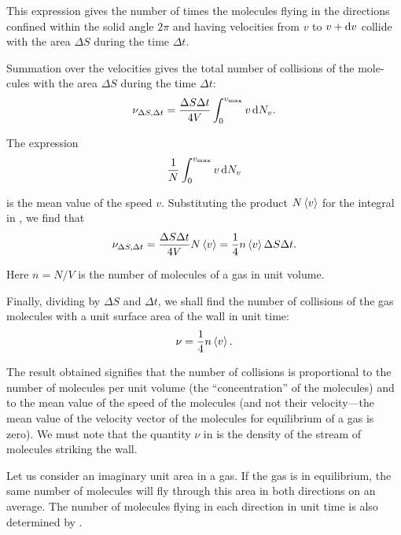 \noindent
This expression gives the number of times the molecules flying in the directions confined within the solid angle $2\pi$ and having velocities from $v$ to $v+\mathrm{d} v$ collide with the area $\Delta S$ during the time $\Delta t$.

Summation over the velocities gives the total number of collisions of the mole-cules with the area $\Delta S$ during the time $\Delta t$:
\begin{equation}\label{eq:11_21}
	\nu_{\Delta S,\Delta t} = \frac{\Delta S \Delta t}{4V} \int_{0}^{v_{\text{max}}} v\,\mathrm{d} N_v.
\end{equation}

\noindent
The expression
\begin{equation*}
	\frac{1}{N}\int_{0}^{v_{\text{max}}} v\,\mathrm{d} N_v
\end{equation*}

\noindent
is the mean value of the speed $v$. Substituting the product $N\left\langle v \right\rangle$ for the integral in , we find that
\begin{equation}\label{eq:11_22}
	\nu_{\Delta S,\Delta t} = \frac{\Delta S \Delta t}{4V} N\left\langle v \right\rangle = \frac{1}{4}n \left\langle v \right\rangle\Delta S \Delta t.
\end{equation}

\noindent
Here $n=N/V$ is the number of molecules of a gas in unit volume.

Finally, dividing  by $\Delta S$ and $\Delta t$, we shall find the number of collisions of the gas molecules with a unit surface area of the wall in unit time:
\begin{equation}\label{eq:11_23}
	\nu = \frac{1}{4} n \left\langle v \right\rangle.
\end{equation}

\noindent
The result obtained signifies that the number of collisions is proportional to the number of molecules per unit volume (the ``concentration'' of the molecules) and to the mean value of the speed of the molecules (and not their velocity---the mean value of the velocity vector of the molecules for equilibrium of a gas is zero). We must note that the quantity $\nu$ in  is the density of the stream of molecules striking the wall.

Let us consider an imaginary unit area in a gas. If the gas is in equilibrium, the same number of molecules will fly through this area in both directions on an average. The number of molecules flying in each direction in unit time is also determined by .

